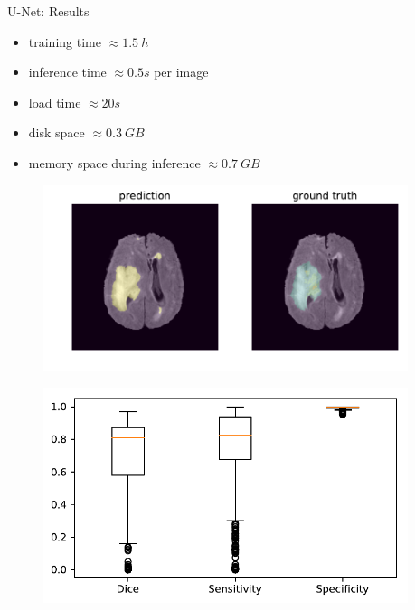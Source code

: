 \documentclass[final]{beamer}
\newlength{\onecolwid}
\newlength{\twocolwid}
\begin{document}
\begin{frame}[t]
\begin{columns}[t]
\begin{column}{\twocolwid}
\begin{columns}[t,totalwidth=\twocolwid]
\begin{column}{\onecolwid}

\end{column} %

\begin{column}{\onecolwid} %


\begin{block}{U-Net: Results}
\begin{itemize}[label={}]
\item training time $\approx \SI{1.5}{h}$
\item inference time $\approx \si{0.5}{s}$ per image
\item load time $\approx \si{20}{s}$
\item disk space $\approx \SI{0.3}{GB}$
\item memory space during inference $\approx \SI{0.7}{GB}$
\end{itemize}
\begin{figure}
\centering
\includegraphics[width=0.7\linewidth]{test_Flair_84}
\end{figure}

\begin{figure}
\includegraphics[width=0.7\linewidth]{boxplots}
\end{figure}
\end{block}


\end{column}
\end{columns}
\end{column}
\end{columns}
\end{frame}
\end{document}
